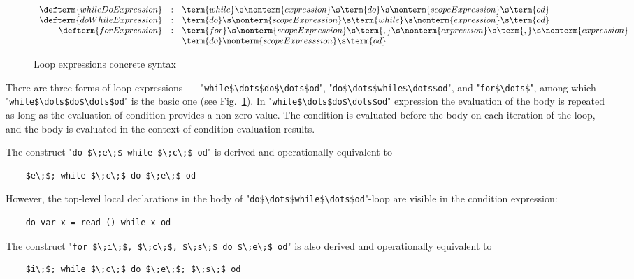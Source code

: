 \begin{figure}[t]
  \[
    \begin{array}{rcl}
      \defterm{whileDoExpression}  & : & \term{while}\s\nonterm{expression}\s\term{do}\s\nonterm{scopeExpression}\s\term{od}\\
      \defterm{doWhileExpression} & : & \term{do}\s\nonterm{scopeExpression}\s\term{while}\s\nonterm{expression}\s\term{od}\\
      \defterm{forExpression}    & : & \term{for}\s\nonterm{scopeExpression}\s\term{,}\s\nonterm{expression}\s\term{,}\s\nonterm{expression}\\
                                 &   & \term{do}\nonterm{scopeExpresssion}\s\term{od}
    \end{array}
  \]
  \caption{Loop expressions concrete syntax}
  \label{loop_expression}
\end{figure}

There are three forms of loop expressions~--- "\lstinline|while$\dots$do$\dots$od|", "\lstinline|do$\dots$while$\dots$od|", and "\lstinline|for$\dots$|", among
which "\lstinline|while$\dots$do$\dots$od|" is the basic one (see Fig.~\ref{loop_expression}). In "\lstinline|while$\dots$do$\dots$od|" expression the evaluation
of the body is repeated as long as the evaluation of condition provides a non-zero value. The condition is evaluated before the body on each iteration of the loop,
and the body is evaluated in the context of condition evaluation results.

The construct "\lstinline|do $\;e\;$ while $\;c\;$ od|" is derived and operationally equivalent to

\begin{lstlisting}
    $e\;$; while $\;c\;$ do $\;e\;$ od
\end{lstlisting}

However, the top-level local declarations in the body of "\lstinline|do$\dots$while$\dots$od|"-loop are visible in the condition expression:

\begin{lstlisting}
    do var x = read () while x od
\end{lstlisting}


The construct "\lstinline|for $\;i\;$, $\;c\;$, $\;s\;$ do $\;e\;$ od|" is also derived and operationally equivalent to

\begin{lstlisting}
    $i\;$; while $\;c\;$ do $\;e\;$; $\;s\;$ od
\end{lstlisting}

